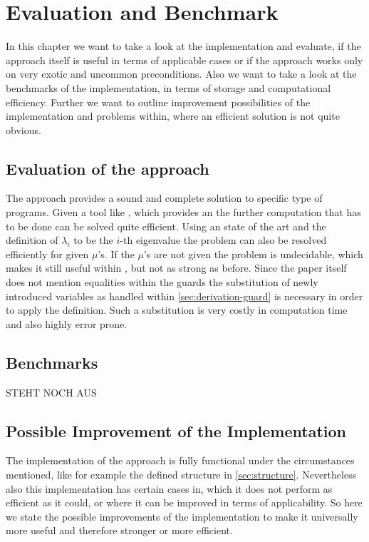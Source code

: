 \chapter{Evaluation and Benchmark}
\label{chapter:eval}
In this chapter we want to take a look at the implementation and evaluate, if the approach itself is useful in terms of applicable cases or if the approach works only on very exotic and uncommon preconditions. \newline
Also we want to take a look at the benchmarks of the implementation, in terms of storage and computational efficiency. \newline
Further we want to outline improvement possibilities of the implementation and problems within, where an efficient solution is not quite obvious.

\section{Evaluation of the approach}
The approach provides a sound and complete solution to specific type of programs. Given a tool like \aprove, which provides an \its the further computation that has to be done can be solved quite efficient. Using an state of the art \solver and the definition of $\lambda_i$ to be the $i$-th eigenvalue the problem can also be resolved efficiently for given $\mu$'s. If the $\mu$'s are not given the problem is undecidable, which makes it still useful within \aprove, but not as strong as before. \newline
Since the paper itself does not mention equalities within the guards the substitution of newly introduced variables as handled within \autoref{sec:derivation-guard} is necessary in order to apply the definition. Such a substitution is very costly in computation time and also highly error prone.

\section{Benchmarks}


STEHT NOCH AUS


\section{Possible Improvement of the Implementation}
The implementation of the approach is fully functional under the circumstances mentioned, like for example the defined structure in \autoref{sec:structure}. Nevertheless also this implementation has certain cases in, which it does not perform as efficient as it could, or where it can be improved in terms of applicability.
So here we state the possible improvements of the implementation to make it universally more useful and therefore stronger or more efficient.
